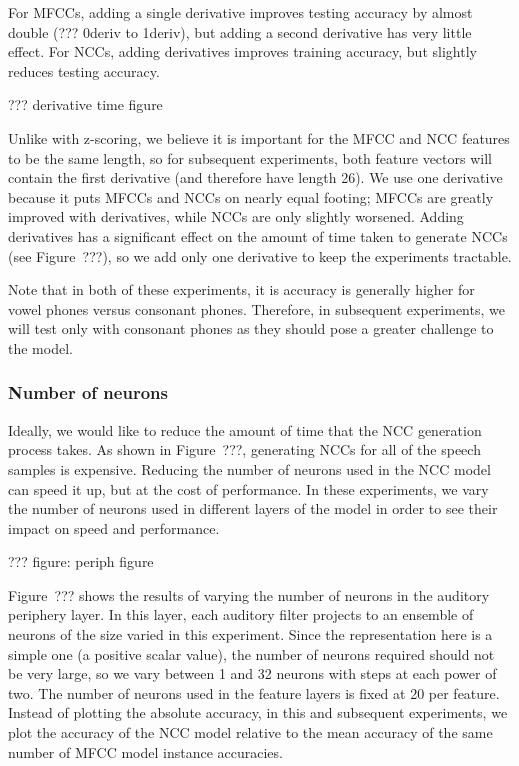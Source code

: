 For MFCCs, adding a single derivative
improves testing accuracy
by almost double
(??? 0deriv to 1deriv),
but adding a second derivative
has very little effect.
For NCCs, adding derivatives
improves training accuracy,
but slightly reduces testing accuracy.

??? derivative time figure

Unlike with z-scoring,
we believe it is important
for the MFCC and NCC features to
be the same length,
so for subsequent experiments,
both feature vectors
will contain the first derivative
(and therefore have length 26).
We use one derivative
because it puts MFCCs and NCCs
on nearly equal footing;
MFCCs are greatly improved
with derivatives,
while NCCs are only slightly worsened.
Adding derivatives
has a significant effect
on the amount of time taken to
generate NCCs
(see Figure~???),
so we add only one derivative
to keep the experiments tractable.

Note that in both of these experiments,
it is accuracy is generally higher
for vowel phones versus consonant phones.
Therefore, in subsequent experiments,
we will test only with consonant phones
as they should pose a greater challenge
to the model.

\subsubsection{Number of neurons}

Ideally,
we would like to reduce the amount of time
that the NCC generation process takes.
As shown in Figure~???,
generating NCCs for all
of the speech samples is expensive.
Reducing the number of neurons
used in the NCC model
can speed it up,
but at the cost of performance.
In these experiments,
we vary the number of neurons used
in different layers of the model
in order to see their impact
on speed and performance.

??? figure: periph figure

Figure~??? shows the results of
varying the number of neurons
in the auditory periphery layer.
In this layer,
each auditory filter projects
to an ensemble of neurons
of the size varied in this experiment.
Since the representation here
is a simple one
(a positive scalar value),
the number of neurons required
should not be very large,
so we vary between
1 and 32 neurons with steps
at each power of two.
The number of neurons used
in the feature layers
is fixed at 20 per feature.
Instead of plotting the absolute accuracy,
in this and subsequent experiments,
we plot the accuracy of the NCC model
relative to the mean accuracy
of the same number
of MFCC model instance accuracies.

